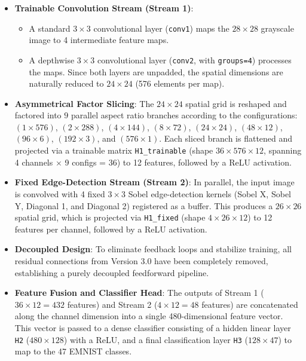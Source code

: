 \documentclass[12pt,a4paper]{article}
\begin{document}
\begin{itemize}
    \item \textbf{Trainable Convolution Stream (Stream 1)}:
          \begin{itemize}
              \item A standard $3 \times 3$ convolutional layer (\texttt{conv1}) maps the $28 \times 28$ grayscale image to 4 intermediate feature maps.
              \item A depthwise $3 \times 3$ convolutional layer (\texttt{conv2}, with \texttt{groups=4}) processes the maps. Since both layers are unpadded, the spatial dimensions are naturally reduced to $24 \times 24$ (576 elements per map).
          \end{itemize}
    \item \textbf{Asymmetrical Factor Slicing}: 
          The $24 \times 24$ spatial grid is reshaped and factored into $9$ parallel aspect ratio branches according to the configurations: $(1 \times 576)$, $(2 \times 288)$, $(4 \times 144)$, $(8 \times 72)$, $(24 \times 24)$, $(48 \times 12)$, $(96 \times 6)$, $(192 \times 3)$, and $(576 \times 1)$. Each sliced branch is flattened and projected via a trainable matrix \texttt{H1\_trainable} (shape $36 \times 576 \times 12$, spanning 4 channels $\times$ 9 configs = 36) to 12 features, followed by a ReLU activation.
    \item \textbf{Fixed Edge-Detection Stream (Stream 2)}:
          In parallel, the input image is convolved with 4 fixed $3 \times 3$ Sobel edge-detection kernels (Sobel X, Sobel Y, Diagonal 1, and Diagonal 2) registered as a buffer. This produces a $26 \times 26$ spatial grid, which is projected via \texttt{H1\_fixed} (shape $4 \times 26 \times 12$) to 12 features per channel, followed by a ReLU activation.
    \item \textbf{Decoupled Design}:
          To eliminate feedback loops and stabilize training, all residual connections from Version 3.0 have been completely removed, establishing a purely decoupled feedforward pipeline.
    \item \textbf{Feature Fusion and Classifier Head}:
          The outputs of Stream 1 ($36 \times 12 = 432$ features) and Stream 2 ($4 \times 12 = 48$ features) are concatenated along the channel dimension into a single 480-dimensional feature vector. This vector is passed to a dense classifier consisting of a hidden linear layer \texttt{H2} ($480 \times 128$) with a ReLU, and a final classification layer \texttt{H3} ($128 \times 47$) to map to the 47 EMNIST classes.
\end{itemize}
\end{document}
